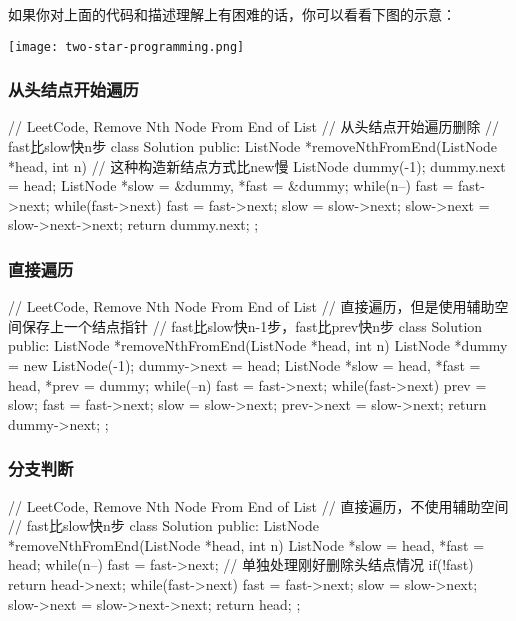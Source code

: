 如果你对上面的代码和描述理解上有困难的话，你可以看看下图的示意：

\begin{center}
    \texttt{[image: two-star-programming.png]}\\
    \label{fig:two-star-programming}
\end{center}

\subsubsection{从头结点开始遍历}

\begin{Code}
// LeetCode, Remove Nth Node From End of List
// 从头结点开始遍历删除
// fast比slow快n步
class Solution {
public:
    ListNode *removeNthFromEnd(ListNode *head, int n) {
        // 这种构造新结点方式比new慢
        ListNode dummy(-1); dummy.next = head;
        ListNode *slow = &dummy, *fast = &dummy;
        while(n--) fast = fast->next;
        while(fast->next) {
            fast = fast->next; slow = slow->next;
        }
        slow->next = slow->next->next;
        return dummy.next;
    }
};
\end{Code}

\subsubsection{直接遍历}

\begin{Code}
// LeetCode, Remove Nth Node From End of List
// 直接遍历，但是使用辅助空间保存上一个结点指针
// fast比slow快n-1步，fast比prev快n步
class Solution {
    public:
    ListNode *removeNthFromEnd(ListNode *head, int n) {
        ListNode *dummy = new ListNode(-1); dummy->next = head;
        ListNode *slow = head, *fast = head, *prev = dummy;
        while(--n) fast = fast->next;
        while(fast->next) {
            prev = slow; fast = fast->next; slow = slow->next;
        }
        prev->next = slow->next;
        return dummy->next;
    }
};
\end{Code}

\subsubsection{分支判断}

\begin{Code}
// LeetCode, Remove Nth Node From End of List
// 直接遍历，不使用辅助空间
// fast比slow快n步
class Solution {
    public:
    ListNode *removeNthFromEnd(ListNode *head, int n) {
        ListNode *slow = head, *fast = head;
        while(n--) fast = fast->next;
        // 单独处理刚好删除头结点情况
        if(!fast) return head->next;
        while(fast->next) {
            fast = fast->next; slow = slow->next;
        }
        slow->next = slow->next->next;
        return head;
    }
};
\end{Code}

